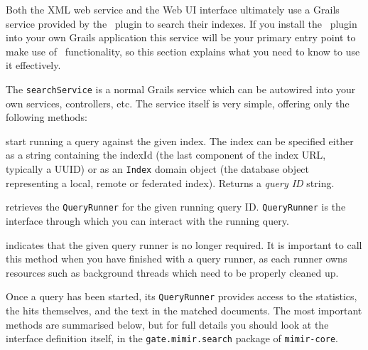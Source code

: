 Both the XML web service and the Web UI interface ultimately use a Grails
service provided by the \Mimir\ plugin to search their indexes.  If you install
the \Mimir\ plugin into your own Grails application this service will be your
primary entry point to make use of \Mimir\ functionality, so this section
explains what you need to know to use it effectively.

The {\tt searchService} is a normal Grails service which can be autowired into
your own services, controllers, etc.  The service itself is very simple,
offering only the following methods:

\bde
\item[postQuery(index, queryString)] start running a query against the given
  index.  The index can be specified either as a string containing the indexId
  (the last component of the index URL, typically a UUID) or as an {\tt Index}
  domain object (the database object representing a local, remote or federated
  index).  Returns a {\em query ID} string.
\item[getQueryRunner(queryId)] retrieves the {\tt QueryRunner} for the given
  running query ID.  {\tt QueryRunner} is the interface through which you can
  interact with the running query.
\item[closeQueryRunner(queryId)] indicates that the given query runner is no
  longer required.  It is important to call this method when you have finished
  with a query runner, as each runner owns resources such as background threads
  which need to be properly cleaned up.
\ede

Once a query has been started, its {\tt QueryRunner} provides access to the
statistics, the hits themselves, and the text in the matched documents.  The
most important methods are summarised below, but for full details you should
look at the interface definition itself, in the {\tt gate.mimir.search} package
of {\tt mimir-core}.

